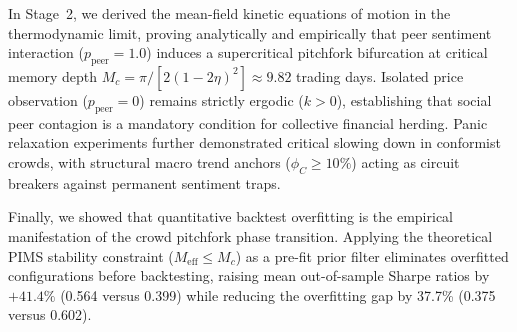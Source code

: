 \documentclass[10pt,twocolumn,twoside,a4paper]{article}
\begin{document}
In Stage~2, we derived the mean-field kinetic equations of motion in the thermodynamic limit, proving
analytically and empirically that peer sentiment interaction ($p_{\text{peer}}=1.0$) induces a
supercritical pitchfork bifurcation at critical memory depth $M_c=\pi/[2(1-2\eta)^2]\approx9.82$
trading days. Isolated price observation ($p_{\text{peer}}=0$) remains strictly ergodic ($k>0$),
establishing that social peer contagion is a mandatory condition for collective financial herding.
Panic relaxation experiments further demonstrated critical slowing down in conformist crowds, with
structural macro trend anchors ($\phi_C\ge10\%$) acting as circuit breakers against permanent
sentiment traps.

Finally, we showed that quantitative backtest overfitting is the empirical manifestation of the
crowd pitchfork phase transition. Applying the theoretical PIMS stability constraint
($M_{\text{eff}}\le M_c$) as a pre-fit prior filter eliminates overfitted configurations before
backtesting, raising mean out-of-sample Sharpe ratios by $+41.4\%$ (0.564 versus 0.399) while
reducing the overfitting gap by 37.7\% (0.375 versus 0.602).
\end{document}
